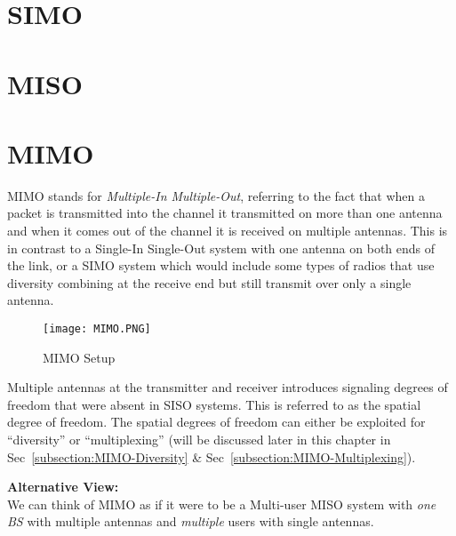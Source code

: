 \section{SIMO}

\section{MISO}

\section{MIMO}
MIMO stands for \emph{Multiple-In Multiple-Out}, referring to the fact that when a packet is transmitted into the channel it transmitted on more than one antenna and when it comes out of the channel it is received on multiple antennas. This is in contrast to a Single-In Single-Out system with one antenna on both ends of the link, or a SIMO system which would include some types of radios that use diversity combining at the receive end but still transmit over only a single antenna.
\begin{figure}[ht]
    \centering
    \texttt{[image: MIMO.PNG]}
    \caption{MIMO Setup}
    \label{fig:MIMO}
\end{figure}

Multiple antennas at the transmitter and receiver introduces signaling degrees of freedom that were absent in SISO systems. This is referred to as the spatial degree of freedom. The spatial degrees of freedom can either be exploited for “diversity” or “multiplexing” (will be discussed later in this chapter in Sec~\ref{subsection:MIMO-Diversity} \& Sec~\ref{subsection:MIMO-Multiplexing}).

\begin{GrayBox}
    \textbf{Alternative View:} \\
    We can think of MIMO as if it were to be a Multi-user MISO system with \emph{one BS} with multiple antennas and \emph{multiple} users with single antennas.
\end{GrayBox}

